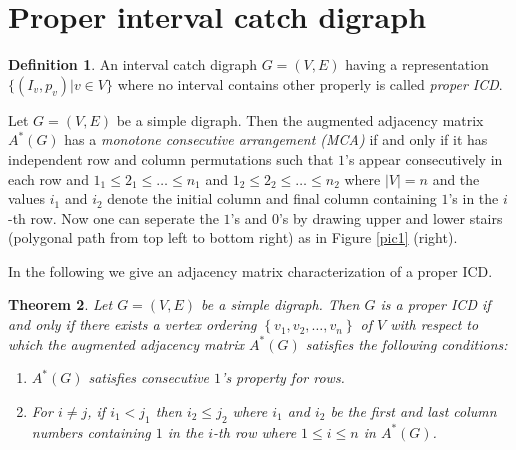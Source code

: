 \documentclass{article}
\newtheorem{thm}{Theorem}[section]
\theoremstyle{definition}
\newtheorem{defn}[thm]{Definition}
\numberwithin{equation}{section}
\newcommand{\set}[1]{\left\{#1\right\}}
\begin{document}
\section{Proper interval catch digraph}

\begin{defn}
An interval catch digraph $G=(V,E)$ having a representation $\{(I_{v},p_{v})|v\in V\}$ where no interval contains other properly is called {\em proper ICD}.
\end{defn}


\noindent Let $G=(V,E)$ be a simple digraph. Then the augmented adjacency matrix $A^{*}(G)$ has a {\em monotone consecutive arrangement (MCA)} \cite{BDGS} if and only if it has independent row and column permutations such that $1$'s appear consecutively in each row and $1_1\leq 2_1  \leq \hdots \leq n_1$ and $1_2\leq 2_2\leq \hdots\leq n_2$ where $|V|=n$ and the values ${i_{1}}$ and $i_{2}$ denote the initial column and final column containing $1$'s in the $i$-th row. Now one can seperate the $1$'s and $0$'s by drawing upper and lower stairs (polygonal path from top left to bottom right) as in Figure \ref{pic1} (right).

\vspace{0.3em}
\noindent In the following we give an adjacency matrix characterization of a proper ICD.

\begin{thm}\label{picd1}
Let $G=(V,E)$ be a simple digraph. Then $G$ is a proper ICD if and only if there exists a vertex ordering $\set{v_1,v_2,\ldots,v_n}$ of $V$ with respect to which the augmented adjacency matrix $A^{*}(G)$ satisfies the following conditions:

\begin{enumerate}	
\item[(1)] $A^{*}(G)$ satisfies consecutive $1$'s property for rows.
\item[(2)] For $i\neq j$, if $i_{1}<j_{1}$ then $i_{2}\leq j_{2}$ where $i_{1}$ and $i_{2}$ be the first and last column numbers containing $1$ in the $i$-th row where $1\leq i\leq n$ in $A^*(G)$.
\end{enumerate}	
\end{thm}
\end{document}

